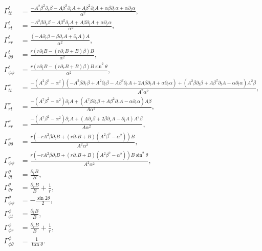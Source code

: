 \begin{align}
\Gamma^{t}_{t t}&= \frac{- A^{2} \beta^{2} \partial_{r} \beta - A \beta^{3} \partial_{r} A + A \beta^{2} \partial_{t} A + \alpha \beta \partial_{r} \alpha + \alpha \partial_{t} \alpha}{\alpha^{2}} ,\\
\Gamma^{t}_{r t}&= \frac{- A^{2} \beta \partial_{r} \beta - A \beta^{2} \partial_{r} A + A \beta \partial_{t} A + \alpha \partial_{r} \alpha}{\alpha^{2}} ,\\
\Gamma^{t}_{r r}&= \frac{\left(- A \partial_{r} \beta - \beta \partial_{r} A + \partial_{t} A\right) A}{\alpha^{2}} ,\\
\Gamma^{t}_{\theta \theta}&= \frac{r \left(r \partial_{t} B - \left(r \partial_{r} B + B\right) \beta\right) B}{\alpha^{2}} ,\\
\Gamma^{t}_{\phi \phi}&= \frac{r \left(r \partial_{t} B - \left(r \partial_{r} B + B\right) \beta\right) B \sin^{2}{\theta}}{\alpha^{2}} ,\\
\Gamma^{r}_{t t}&= \frac{- \left(A^{2} \beta^{2} - \alpha^{2}\right) \left(- A^{2} \beta \partial_{r} \beta + A^{2} \partial_{t} \beta - A \beta^{2} \partial_{r} A + 2 A \beta \partial_{t} A + \alpha \partial_{r} \alpha\right) + \left(A^{2} \beta \partial_{t} \beta + A \beta^{2} \partial_{t} A - \alpha \partial_{t} \alpha\right) A^{2} \beta}{A^{2} \alpha^{2}} ,\\
\Gamma^{r}_{r t}&= \frac{- \left(A^{2} \beta^{2} - \alpha^{2}\right) \partial_{t} A + \left(A^{2} \beta \partial_{r} \beta + A \beta^{2} \partial_{r} A - \alpha \partial_{r} \alpha\right) A \beta}{A \alpha^{2}} ,\\
\Gamma^{r}_{r r}&= \frac{- \left(A^{2} \beta^{2} - \alpha^{2}\right) \partial_{r} A + \left(A \partial_{r} \beta + 2 \beta \partial_{r} A - \partial_{t} A\right) A^{2} \beta}{A \alpha^{2}} ,\\
\Gamma^{r}_{\theta \theta}&= \frac{r \left(- r A^{2} \beta \partial_{t} B + \left(r \partial_{r} B + B\right) \left(A^{2} \beta^{2} - \alpha^{2}\right)\right) B}{A^{2} \alpha^{2}} ,\\
\Gamma^{r}_{\phi \phi}&= \frac{r \left(- r A^{2} \beta \partial_{t} B + \left(r \partial_{r} B + B\right) \left(A^{2} \beta^{2} - \alpha^{2}\right)\right) B \sin^{2}{\theta}}{A^{2} \alpha^{2}} ,\\
\Gamma^{\theta}_{\theta t}&= \frac{\partial_{t} B}{B} ,\\
\Gamma^{\theta}_{\theta r}&= \frac{\partial_{r} B}{B} + \frac{1}{r} ,\\
\Gamma^{\theta}_{\phi \phi}&= - \frac{\sin{2 \theta }}{2} ,\\
\Gamma^{\phi}_{\phi t}&= \frac{\partial_{t} B}{B} ,\\
\Gamma^{\phi}_{\phi r}&= \frac{\partial_{r} B}{B} + \frac{1}{r} ,\\
\Gamma^{\phi}_{\phi \theta}&= \frac{1}{\tan{\theta}}.
\end{align}
